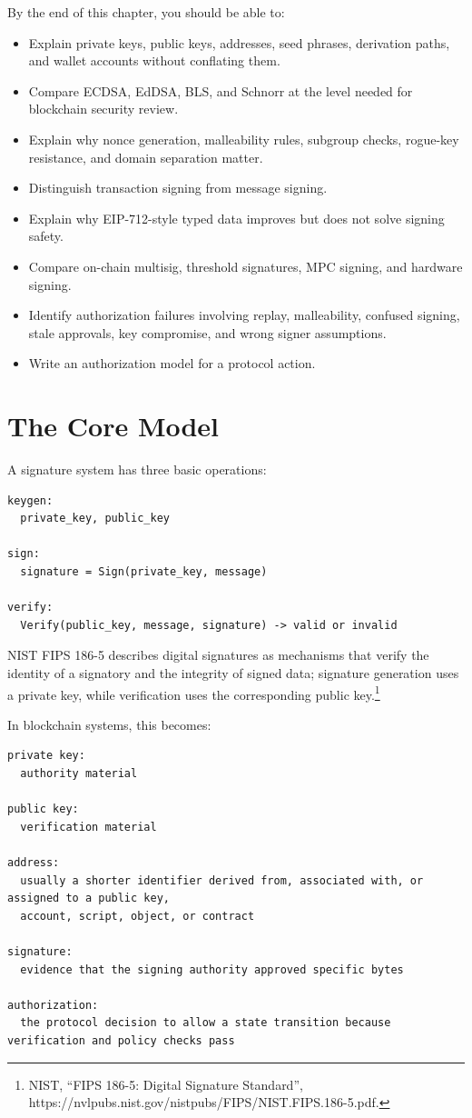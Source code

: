 By the end of this chapter, you should be able to:

\begin{itemize}
\tightlist
\item
  Explain private keys, public keys, addresses, seed phrases, derivation
  paths, and wallet accounts without conflating them.
\item
  Compare ECDSA, EdDSA, BLS, and Schnorr at the level needed for
  blockchain security review.
\item
  Explain why nonce generation, malleability rules, subgroup checks,
  rogue-key resistance, and domain separation matter.
\item
  Distinguish transaction signing from message signing.
\item
  Explain why EIP-712-style typed data improves but does not solve
  signing safety.
\item
  Compare on-chain multisig, threshold signatures, MPC signing, and
  hardware signing.
\item
  Identify authorization failures involving replay, malleability,
  confused signing, stale approvals, key compromise, and wrong signer
  assumptions.
\item
  Write an authorization model for a protocol action.
\end{itemize}

\section{The Core Model}

A signature system has three basic operations:

\begin{lstlisting}
keygen:
  private_key, public_key

sign:
  signature = Sign(private_key, message)

verify:
  Verify(public_key, message, signature) -> valid or invalid
\end{lstlisting}

NIST FIPS 186-5 describes digital signatures as mechanisms that verify
the identity of a signatory and the integrity of signed data; signature
generation uses a private key, while verification uses the corresponding
public key.\footnote{NIST, ``FIPS 186-5: Digital Signature Standard'',
  https://nvlpubs.nist.gov/nistpubs/FIPS/NIST.FIPS.186-5.pdf.}

In blockchain systems, this becomes:

\begin{lstlisting}
private key:
  authority material

public key:
  verification material

address:
  usually a shorter identifier derived from, associated with, or assigned to a public key,
  account, script, object, or contract

signature:
  evidence that the signing authority approved specific bytes

authorization:
  the protocol decision to allow a state transition because verification and policy checks pass
\end{lstlisting}

